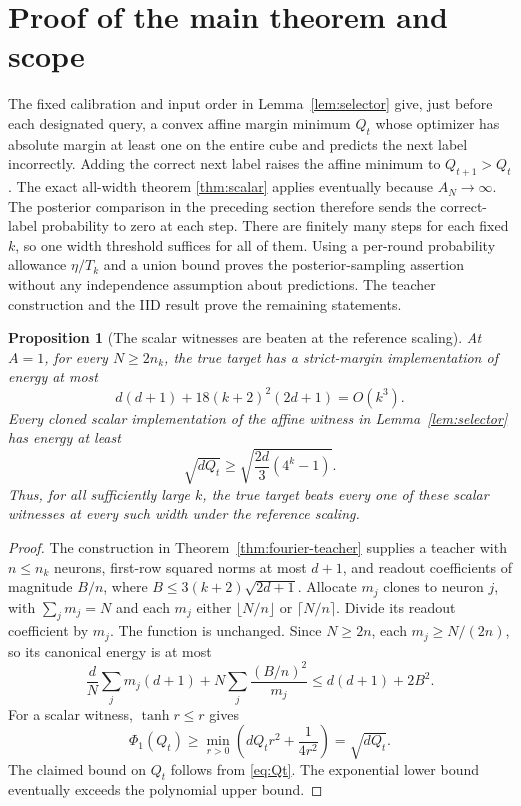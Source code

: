 \documentclass[11pt]{article}
\newtheorem{proposition}[theorem]{Proposition}
\begin{document}
\section{Proof of the main theorem and scope}

The fixed calibration and input order in Lemma~\ref{lem:selector} give,
just before each designated query, a convex affine margin minimum $Q_t$
whose optimizer has absolute margin at least one on the entire cube and
predicts the next label incorrectly. Adding the correct next label raises
the affine minimum to $Q_{t+1}>Q_t$. The exact all-width theorem
\ref{thm:scalar} applies eventually because $A_N\to\infty$.
The posterior comparison in the preceding section therefore sends the
correct-label probability to zero at each step. There are finitely many
steps for each fixed $k$, so one width threshold suffices for all of them.
Using a per-round probability allowance $\eta/T_k$ and a union bound
proves the posterior-sampling assertion without any independence
assumption about predictions. The teacher construction and the IID result
prove the remaining statements.

\begin{proposition}[The scalar witnesses are beaten at the reference scaling]
\label{prop:canonical-comparison}
At $A=1$, for every $N\ge2n_k$, the true target has a strict-margin
implementation of energy at most
\[
 d(d+1)+18(k+2)^2(2d+1)=O(k^3).
\]
Every cloned scalar implementation of the affine witness in
Lemma~\ref{lem:selector} has energy at least
\[
 \sqrt{dQ_t}\ge\sqrt{\frac{2d}{3}(4^k-1)}.
\]
Thus, for all sufficiently large $k$, the true target beats every one of
these scalar witnesses at every such width under the reference scaling.
\end{proposition}
\begin{proof}
The construction in Theorem~\ref{thm:fourier-teacher} supplies a teacher
with $n\le n_k$ neurons, first-row squared norms at most $d+1$, and
readout coefficients of magnitude $B/n$, where
$B\le3(k+2)\sqrt{2d+1}$. Allocate $m_j$ clones to neuron $j$, with
$\sum_jm_j=N$ and each $m_j$ either $\lfloor N/n\rfloor$ or
$\lceil N/n\rceil$. Divide its readout coefficient by $m_j$.
The function is unchanged. Since $N\ge2n$, each $m_j\ge N/(2n)$, so its
canonical energy is at most
\[
 \frac dN\sum_jm_j(d+1)
       +N\sum_j\frac{(B/n)^2}{m_j}
 \le d(d+1)+2B^2.
\]
For a scalar witness, $\tanh r\le r$ gives
\[
 \Phi_1(Q_t)\ge\min_{r>0}\left(dQ_tr^2+\frac1{4r^2}\right)
 =\sqrt{dQ_t}.
\]
The claimed bound on $Q_t$ follows from \eqref{eq:Qt}. The exponential
lower bound eventually exceeds the polynomial upper bound.
\end{proof}
\end{document}
